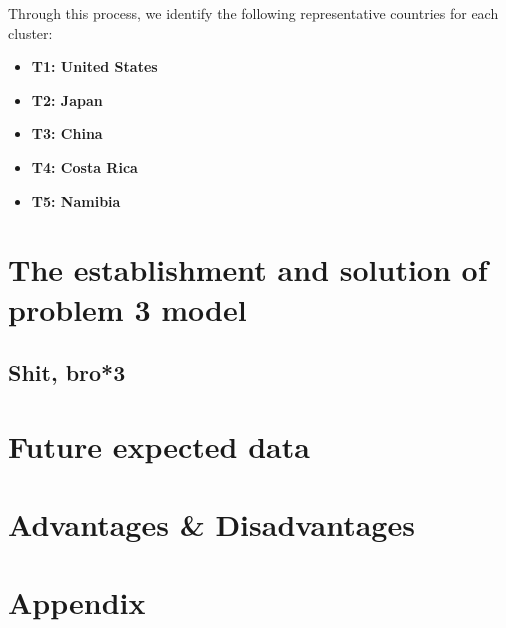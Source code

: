 \documentclass[12pt]{article}
\begin{document}
		Through this process, we identify the following representative countries for each cluster:
		\begin{itemize}
			\item \textbf{T1: United States}
				~\cite{
					congress-website,
					nist-website,
					dhs-website,
					sec-website,
					whitehouse-website,
					investigatory-powers-act-2016,
					ncsc-uk,
					telecom-security-act-2021,
					uk-cyber-security-requirements-2024,
					uk-cybersecurity-timeline-2024}
			\item \textbf{T2: Japan}
				~\cite{
					it-basic-law-japan,
					ppc-legal-japan,
					nisc-japan,
					mofa-japan,
					japan-law-translation,
					cs-strategy-2015-japan,
					cs-strategy-2018-japan,
					telecom-business-act-japan,
					cs-strategy-2021-japan}
			\item \textbf{T3: China}
				~\cite{
					international-cybercrime,
					cybersecurity-law-china,
					internet-censorship-china,
					china-data-security-regulations,
					cryptography-law-china}
			\item \textbf{T4: Costa Rica}
				~\cite{
					costa-rica-cybersecurity-strategy,
					costa-rica-pop-up}
			\item \textbf{T5: Namibia}
				~\cite{
					namibia-pop-up,
					namibia-digital-odyssey,
					namibia-cybersecurity-strategy}
		\end{itemize}

\section{The establishment and solution of problem 3 model}\label{sec:the-establishment-and-solution-of-problem-3-model} %
	\subsection{Shit, bro*3}\label{subsec:shit-bro*3} %
	
\section{Future expected data}\label{sec:future-expected-data} %

\section{Advantages \& Disadvantages}\label{sec:advantages-&-disadvantages} %



\section*{Appendix}\label{sec:appendix} %
\end{document}
